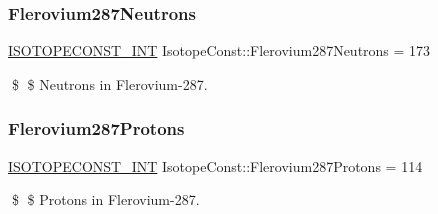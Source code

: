 \subsubsection{\texorpdfstring{Flerovium287\+Neutrons}{Flerovium287Neutrons}}
{\footnotesize\ttfamily \mbox{\hyperlink{group___isotope_const-_macros_ga5f18360b3e99483a35c32d789e62621c}{I\+S\+O\+T\+O\+P\+E\+C\+O\+N\+S\+T\+\_\+\+I\+NT}} Isotope\+Const\+::\+Flerovium287\+Neutrons = 173}

\$ \$ Neutrons in Flerovium-\/287. \mbox{\label{group___isotope_const-_flerovium-_fl287_gae36348348b574f3bb24161b72c31eb41}} 
\subsubsection{\texorpdfstring{Flerovium287\+Protons}{Flerovium287Protons}}
{\footnotesize\ttfamily \mbox{\hyperlink{group___isotope_const-_macros_ga5f18360b3e99483a35c32d789e62621c}{I\+S\+O\+T\+O\+P\+E\+C\+O\+N\+S\+T\+\_\+\+I\+NT}} Isotope\+Const\+::\+Flerovium287\+Protons = 114}

\$ \$ Protons in Flerovium-\/287. 